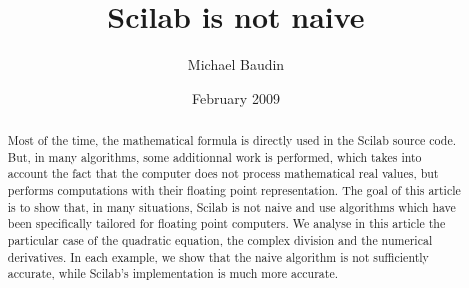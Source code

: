 \documentclass[12pt]{article}
\begin{document}
\author{Michael Baudin}
\date{February 2009}
\title{Scilab is not naive}
\maketitle
\begin{abstract}
Most of the time, the mathematical formula is 
directly used in the Scilab source code. 
But, in many algorithms, some additionnal work is 
performed, which takes into account the fact that 
the computer does not process mathematical real values,
but performs computations with their floating 
point representation.
The goal of this article is to show that, in many
situations, Scilab is not naive and use algorithms
which have been specifically tailored for floating point 
computers. We analyse in this article the 
particular case of the quadratic equation, the 
complex division and the numerical derivatives. 
In each example, we show that the naive algorithm 
is not sufficiently accurate, while Scilab's implementation
is much more accurate. 
\end{abstract}

\tableofcontents












\clearpage

\appendix



%





\end{document}
